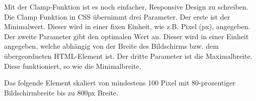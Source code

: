 
Mit der Clamp-Funktion ist es noch einfacher, Responsive Design zu schreiben. Die Clamp Funktion in CSS übernimmt drei Parameter. Der erste ist der Minimalwert. Dieser wird in einer fixen Einheit, wie z.B. Pixel (px), angegeben. Der zweite Parameter gibt den optimalen Wert an. Dieser wird in einer Einheit angegeben, welche abhängig von der Breite des Bildschirms bzw. dem übergeordneten HTML-Element ist. Der dritte Parameter ist die Maximalbreite. Diese funktioniert, so wie die Minimalbreite.

Das folgende Element skaliert von mindestens 100 Pixel mit 80-prozentiger Bildschirmbreite bis zu 800px Breite.

